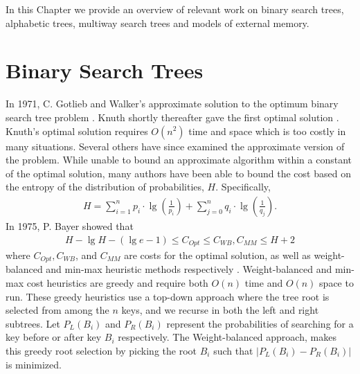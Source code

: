 \documentclass[letterpaper,12pt,titlepage,oneside,final]{book}
\theoremstyle{plain}
\begin{document}
In this Chapter we provide an overview of relevant work on binary search trees, alphabetic trees, multiway search trees and models of external memory.

\section{Binary Search Trees}

In 1971, C. Gotlieb and Walker's approximate solution to the optimum binary search tree problem \cite{walker1971top}. Knuth shortly thereafter gave the first optimal solution \cite{knuth1971optimum}. Knuth's optimal solution requires $O(n^2)$ time and space which is too costly in many situations. Several others have since examined the approximate version of the problem. While unable to bound an approximate algorithm within a constant of the optimal solution, many authors have been able to bound the cost based on the entropy of the distribution of probabilities, $H$. Specifically, 
\begin{align*}
H = \sum_{i=1}^{n} p_i\cdot\lg(\frac{1}{p_i}) + \sum_{j=0}^{n} q_i\cdot\lg(\frac{1}{q_j}).
\end{align*}
In 1975, P. Bayer showed that 
\begin{align*}
H-\lg H-(\lg e-1) \leq C_{Opt} \leq C_{WB}, C_{MM} \leq H + 2
\end{align*}
where $C_{Opt}, C_{WB}$, and $C_{MM}$ are costs for the optimal solution, as well as weight-balanced and min-max heuristic methods respectively \cite{bayer1975improved}. Weight-balanced and min-max cost heuristics are greedy and require both $O(n)$ time and $O(n)$ space to run. These greedy heuristics use a top-down approach where the tree root is selected from among the $n$ keys, and we recurse in both the left and right subtrees. Let $P_L(B_i)$ and $P_R(B_i)$ represent the probabilities of searching for a key before or after key $B_i$ respectively. The Weight-balanced approach, makes this greedy root selection by picking the root $B_i$ such that $|P_L(B_i)-P_R(B_i)|$ is minimized.
\end{document}
